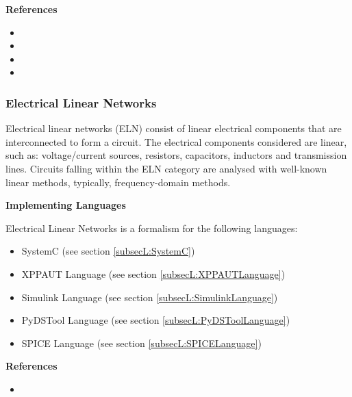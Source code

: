\textbf{References}
\begin{itemize}
	
\item {}
	
\item {}
	
\item {}
	
\item {}
\end{itemize}



\subsubsection{Electrical Linear Networks}
\label{subsecF:ElectricalLinearNetworks}


Electrical linear networks (ELN) consist of linear electrical components that are interconnected to form a circuit. The electrical components considered are linear, such as: voltage/current sources, resistors, capacitors, inductors and transmission lines. Circuits falling within the ELN category are analysed with well-known linear methods, typically, frequency-domain methods.

\textbf{Implementing Languages}

Electrical Linear Networks is a formalism for the following languages:
\begin{itemize}
	\item SystemC (see section \ref{subsecL:SystemC})
	\item XPPAUT Language (see section \ref{subsecL:XPPAUTLanguage})
	\item Simulink Language (see section \ref{subsecL:SimulinkLanguage})
	\item PyDSTool Language (see section \ref{subsecL:PyDSToolLanguage})
	\item SPICE Language (see section \ref{subsecL:SPICELanguage})
\end{itemize}





\textbf{References}
\begin{itemize}
	
\item {}
\end{itemize}



